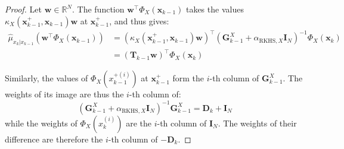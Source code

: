 \begin{proof}
	Let $\mathbf{w}\in\mathbb{R}^N$. The function $\mathbf{w}^\top\Phi_X(\mathbf{x}_{k-1})$ takes the values $\kappa_X\left(\mathbf{x}_{k-1}^+,\mathbf{x}_{k-1}\right)\mathbf{w}$ at $\mathbf{x}_{k-1}^+$, and  thus gives:
	\begin{equation}
		\begin{aligned}
		\hat{\mu}_{x_k|x_{k-1}}\left(\mathbf{w}^\top\Phi_X(\mathbf{x}_{k-1})\right)&=\left(\kappa_X\left(\mathbf{x}_{k-1}^+,\mathbf{x}_{k-1}\right)\mathbf{w}\right)^\top\left(\mathbf{G}_{k-1}^X+\alpha_{\mathrm{RKHS},X}\mathbf{I}_N\right)^{-1}\Phi_X(\mathbf{x}_k)\\
		&=(\mathbf{T}_{k-1}\mathbf{w})^\top\Phi_X(\mathbf{x}_k)
		\end{aligned}
	\end{equation}

	Similarly, the values of $\Phi_X\left(x_{k-1}^{+(i)}\right)$ at $\mathbf{x}_{k-1}^+$ form the $i$-th column of $\mathbf{G}_{k-1}^X$. The weights of its image are thus the $i$-th column of:
	\begin{equation}
		\left(\mathbf{G}_{k-1}^X+\alpha_{\mathrm{RKHS},X}\mathbf{I}_N\right)^{-1}\mathbf{G}_{k-1}^X=\mathbf{D}_k+\mathbf{I}_N
	\end{equation}
	while the weights of $\Phi_X\left(x_k^{(i)}\right)$ are the $i$-th column of $\mathbf{I}_N$. The weights of their difference are therefore the $i$-th column of $-\mathbf{D}_k$.
\end{proof}

